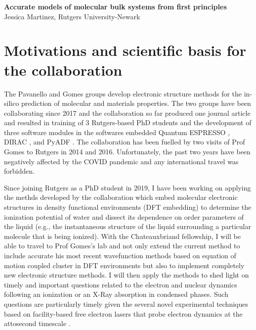 \documentclass[notitlepage,12pt]{report}
\begin{document}
	\renewcommand\Affilfont{\itshape\small}
\begin{center}
    \textbf{\LARGE Accurate models of molecular bulk systems from first principles}\\
    Jessica Martinez, Rutgers University-Newark
\end{center}
\section{Motivations and scientific basis for the collaboration}

The Pavanello and Gomes groups develop electronic structure methods for the in-silico prediction of molecular and materials properties. The two groups have been collaborating since 2017 and the collaboration so far produced one journal article \supercite{tolle2019charged} and resulted in training of 3 Rutgers-based PhD students and the development of three software modules in the softwares embedded Quantum ESPRESSO \supercite{}, DIRAC \supercite{}, and PyADF \supercite{}. The collaboration has been fuelled by two visits of Prof Gomes to Rutgers in 2014 and 2016. Unfortunately, the past two years have been negatively affected by the COVID pandemic and any international travel was forbidden. 

Since joining Rutgers as a PhD student in 2019, I have been working on applying the methds developed by the collaboration which embed molecular  electronic structures in density functional environments (DFT embedding) to determine the ionization potential of water and dissect its dependence on order parameters of the liquid (e.g., the instantaneous structure of  the liquid surrounding a particular molecule that is being ionized).  With the Chateauxbriand fellowship, I will be able to travel to Prof Gomes's lab and not only extend the current method to include accurate his most recent wavefunction methods based on equation of motion coupled cluster in DFT environments but also to implement completely new electronic structure methods. I will then apply the methods to shed light on timely and important questions related to the electron and nuclear dynamics following an ionization or an X-Ray absorption in condensed phases. Such questions are particularly timely given the several novel experimental techniques based on facility-based free electron lasers that probe electron dynamics at the attosecond timescale \supercite{}.  
\end{document}
